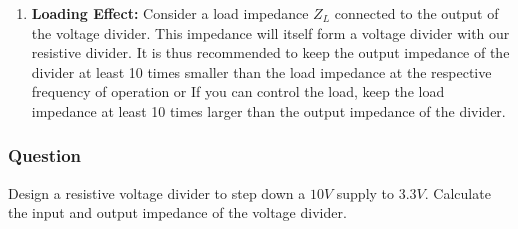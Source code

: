 \begin{enumerate}
    \paragraph{At Output:}
      \begin{align*}
        Z_{out} &= \frac{1}{G_1 + G2} \\
        Z_{out} &= \frac{1}{\frac{1}{R_1} + \frac{1}{R_2}} \hspace{1cm} \text{(Substituting \(G_1 = \frac{1}{R_1}\) and \(G_2 = \frac{1}{R_2}\))} \\
        Z_{out} &= \frac{1}{\frac{R_1 + R_2}{R_1 R_2}} \\
        Z_{out} &= \frac{R_1 R_2}{R_1 + R_2}
      \end{align*}
  \item \textbf{Loading Effect:}
    Consider a load impedance \(Z_L\) connected to the output of the voltage
    divider. This impedance will itself form a voltage divider with our
    resistive divider. It is thus recommended to keep the output impedance
    of the divider at least 10 times smaller than the load impedance at the
    respective frequency of operation or If you can control the load,
    keep the load impedance at least 10 times larger than the output
    impedance of the divider.
\end{enumerate}

\subsubsection{Question}
Design a resistive voltage divider to step down a \(10V\) supply to
\(3.3V\). Calculate the input and output impedance of the voltage divider.
